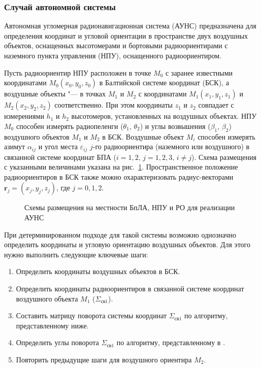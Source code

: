 \documentclass[../main.tex]{subfiles}
\begin{document}
\subsubsection{Случай автономной системы}
Автономная угломерная радионавигационная система (АУНС) предназначена для определения координат и угловой ориентации в пространстве двух воздушных объектов, оснащенных высотомерами и бортовыми радиоориентирами с наземного пункта управления (НПУ), оснащенного радиоориентиром.

Пусть радиоориентир НПУ расположен в точке $M_0$ с заранее известными координатами $M_0\left(x_0, y_0, z_0\right)$ в Балтийской системе координат (БСК), а воздушные объекты "--- в точках $M_1$ и $M_2$ с координатами $M_1\left(x_1, y_1, z_1\right)$ и $M_2\left(x_2, y_2, z_2\right)$ соответственно. При этом координаты $z_1$ и $z_2$ совпадает с измерениями $h_1$ и $h_2$ высотомеров, установленных на воздушных объектах. НПУ $M_0$ способен измерять радиопеленги ($\theta_1$, $\theta_2$) и углы возвышения ($\beta_1$, $\beta_2$) воздушного объектов $M_1$ и $M_2$ в БСК. Воздушные объект $M_i$ способен измерять азимут $\alpha_{ij}$ и угол места $\varepsilon_{ij}$ $j$-го радиоориентира (наземного или воздушного) в связанной системе координат БПА ($i = 1,2$, $j = 1,2,3$, $i \ne j$). Схема размещения с указанными величинами указана на рис.~\ref{fig:systems:pic3}. Пространственное положение радиоориентиров в БСК также можно охарактеризовать радиус-векторами $\mathbf{r}_j = \left(x_j, y_j, z_j\right)$, где $j = 0,1,2$.

\begin{figure}[htbp]
    \begin{center}


    \caption{Схемы размещения на местности БпЛА, НПУ и РО для реализации АУНС}
    \label{fig:systems:pic3}
    \end{center}
\end{figure}

При детерминированном подходе для такой системы возможно однозначно определить координаты и угловую ориентацию воздушных объектов. Для этого нужно выполнить следующие ключевые шаги:
\begin{enumerate}
    \item Определить координаты воздушных объектов в БСК.
    \item Определить координаты радиоориентиров в связанной системе координат воздушного объекта $M_1$ ($\Sigma_{\text{св}1}$).
    \item Составить матрицу поворота системы координат $\Sigma_{\text{св}1}$ по алгоритму, представленному ниже.
    \item Определить углы поворота $\Sigma_{\text{св}1}$ по алгоритму, представленному в \cite{antennas}.
    \item Повторить предыдущие шаги для воздушного ориентира $M_2$.
\end{enumerate}
\end{document}
